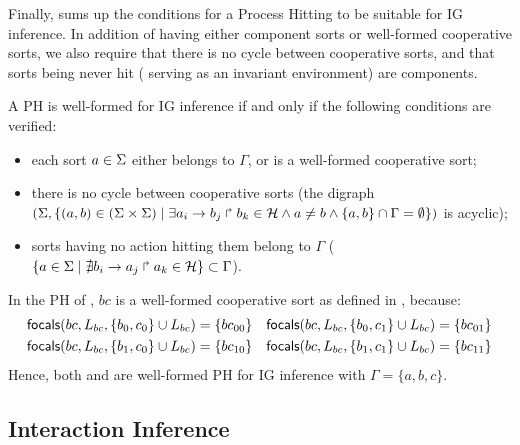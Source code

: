 Finally,  sums up the conditions for a Process Hitting to be suitable for IG
inference.
In addition of having either component sorts or well-formed cooperative sorts, we also require that
there is no cycle between cooperative sorts, and that
sorts being never hit (\ie{} serving as an invariant environment) are components.

\begin{property}\label{pro:wf-ph}
A PH is well-formed for IG inference if and only if the following conditions are verified:
\begin{itemize}
\item 
each sort $a\in\Sigma$ either belongs to $\Gamma$, or is a well-formed cooperative sort;
\item 
there is no cycle between cooperative sorts
(the digraph $(\Sigma,\{(a,b)\in(\Sigma\times\Sigma)\mid \exists a_i\rightarrow b_j\Rsh b_k\in\mathcal{H}
\wedge a\neq b\wedge \{a,b\}\cap\Gamma=\emptyset \})$ is
acyclic);
\item 
sorts having no action hitting them belong to $\Gamma$
($\{ a \in \Sigma\mid \nexists b_i\rightarrow a_j\Rsh a_k\in\mathcal{H}\} \subset \Gamma$).
\end{itemize}
\end{property}

\begin{example*}
In the PH of , $bc$ is a well-formed cooperative sort as defined in , because:
\begin{align*}
\mathsf{focals}(bc, L_{bc}, \{b_0, c_0\} \cup L_{bc}) = \{bc_{00}\} && \mathsf{focals}(bc, L_{bc}, \{b_0, c_1\} \cup L_{bc}) = \{bc_{01}\} \\
\mathsf{focals}(bc, L_{bc}, \{b_1, c_0\} \cup L_{bc}) = \{bc_{10}\} && \mathsf{focals}(bc, L_{bc}, \{b_1, c_1\} \cup L_{bc}) = \{bc_{11}\}
\end{align*}
Hence, both  and  are well-formed PH for IG inference
with $\Gamma = \{a,b,c\}$.
\end{example*}


\subsection{Interaction Inference}\label{ssec:infer-IG}

